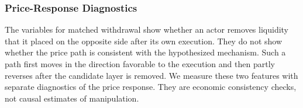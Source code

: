 \documentclass[11pt]{article}
\newenvironment{review}{\begingroup\color{blue}}{\endgroup}
\begin{document}
\subsubsection{Price-Response Diagnostics}
\label{subsec:price_response_diagnostics}

\begin{review}The variables for matched withdrawal show whether an actor removes liquidity that it placed on the opposite side after its own execution.\end{review} They do not show whether the price path is consistent with the hypothesized mechanism. Such a path first moves
in the direction favorable to the execution and then partly reverses after the candidate layer is removed. We
measure these two features with \begin{review}separate diagnostics of the price response\end{review}. They are economic consistency checks, not causal
estimates of manipulation.
\end{document}
